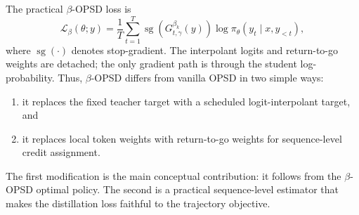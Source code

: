 The practical $\beta$-OPSD loss is
\begin{equation}
    \mathcal{L}_{\beta}(\theta;y)
    =
    \frac{1}{T}
    \sum_{t=1}^{T}
    \operatorname{sg}
    \left(
    G_{t,\gamma}^{\beta_k}(y)
    \right)
    \log \pi_\theta(y_t\mid x,y_{<t}),
    \label{eq:slide_loss}
\end{equation}
where $\operatorname{sg}(\cdot)$ denotes stop-gradient. 
The interpolant logits and
return-to-go weights are detached; the only gradient path is through the student
log-probability. Thus, $\beta$-OPSD differs from vanilla OPSD in two simple ways:
\begin{enumerate}
    \item it replaces the fixed teacher target with a scheduled logit-interpolant target, and
    \item it replaces local token weights with return-to-go weights for sequence-level credit
    assignment.
\end{enumerate}

The first modification is the main conceptual contribution: it follows from the
$\beta$-OPSD optimal policy. The second is a practical sequence-level estimator that makes
the distillation loss faithful to the trajectory objective.
